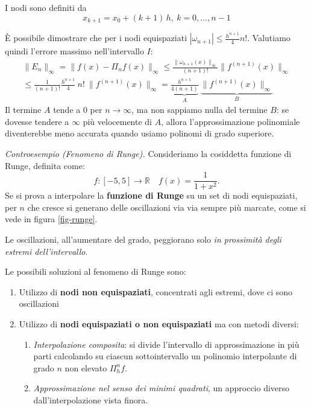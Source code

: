 I nodi sono definiti da 
\begin{equation*}
    x_{k+1}=x_0+(k+1)\,h,\ k=0,\dots,n-1
\end{equation*}

È possibile dimostrare che per i nodi equispaziati $|\omega_{n+1}|\le \frac{h^{n+1}} 4 n!$. Valutiamo quindi l'errore massimo nell'intervallo $I$:
\begin{multline*}
    \|E_n\|_\infty=\|f(x)-\Pi_n f(x)\|_\infty \le \frac{\|\omega_{n+1}(x)\|_\infty}{(n+1)!}\| f^{(n+1)}(x) \|_\infty\\
    \le   \frac{1}{(n+1)!} \frac{h^{n+1}}{4}\ n!\ \| \!f^{(n+1)}(x) \|_\infty
    =\underbrace{\frac{h^{n+1}}{4(n+1)}}_A \ \underbrace{\| \!f^{(n+1)}(x) \|_\infty}_B
\end{multline*}
Il termine $A$ tende a $0$ per $n\to\infty$, ma non sappiamo nulla del termine $B$: se dovesse tendere a $\infty$ più velocemente di $A$, allora l'approssimazione polinomiale diventerebbe meno accurata quando usiamo polinomi di grado superiore.

\textit{Controesempio (Fenomeno di Runge).}
Consideriamo la cosiddetta funzione di Runge, definita come:
\begin{equation*}
f:[ -5,5]\rightarrow \mathbb{R} \quad f(x) =\frac{1}{1+x^{2}}.
\end{equation*}
Se si prova a interpolare la \textbf{funzione di Runge} su un set di nodi equispaziati, per $n$ che cresce si generano delle oscillazioni via via sempre più marcate, come si vede in figura \ref{fig-runge}.


Le oscillazioni, all'aumentare del grado, peggiorano solo \textit{in prossimità degli estremi dell'intervallo}.


 Le possibili soluzioni al fenomeno di Runge sono:
\begin{enumerate}
\item Utilizzo di \textbf{nodi non equispaziati}, concentrati agli estremi, dove ci sono oscillazioni
\item Utilizzo di \textbf{nodi equispaziati o non equispaziati} ma con metodi diversi:
\begin{enumerate}
\item \textit{Interpolazione composita}: si divide l'intervallo di approssimazione in più parti calcolando su ciascun sottointervallo un polinomio interpolante di grado $n$ non elevato $\Pi ^{n}_{h} f$.
\item \textit{Approssimazione nel senso dei minimi quadrati}, un approccio diverso dall'interpolazione vista finora.
\end{enumerate}
\end{enumerate}
